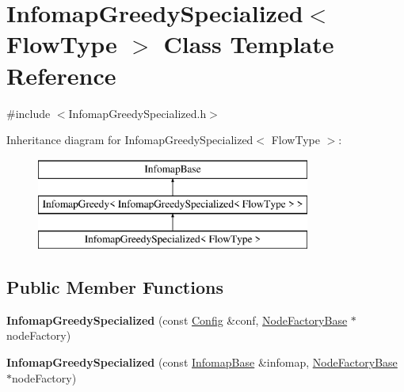 \hypertarget{classInfomapGreedySpecialized}{}\section{Infomap\+Greedy\+Specialized$<$ Flow\+Type $>$ Class Template Reference}
\label{classInfomapGreedySpecialized}


{\ttfamily \#include $<$Infomap\+Greedy\+Specialized.\+h$>$}

Inheritance diagram for Infomap\+Greedy\+Specialized$<$ Flow\+Type $>$\+:\begin{figure}[H]
\begin{center}
\leavevmode
\includegraphics[height=3.000000cm]{classInfomapGreedySpecialized}
\end{center}
\end{figure}
\subsection*{Public Member Functions}
\begin{DoxyCompactItemize}
\item 
\mbox{\label{classInfomapGreedySpecialized_a857f5bdae7458ff36f7aee81878ee635}} 
{\bfseries Infomap\+Greedy\+Specialized} (const \mbox{\hyperlink{structConfig}{Config}} \&conf, \mbox{\hyperlink{classNodeFactoryBase}{Node\+Factory\+Base}} $\ast$node\+Factory)
\item 
\mbox{\label{classInfomapGreedySpecialized_ad2b03c6dcc7523d98f174bfb75daafc5}} 
{\bfseries Infomap\+Greedy\+Specialized} (const \mbox{\hyperlink{classInfomapBase}{Infomap\+Base}} \&infomap, \mbox{\hyperlink{classNodeFactoryBase}{Node\+Factory\+Base}} $\ast$node\+Factory)
\end{DoxyCompactItemize}
